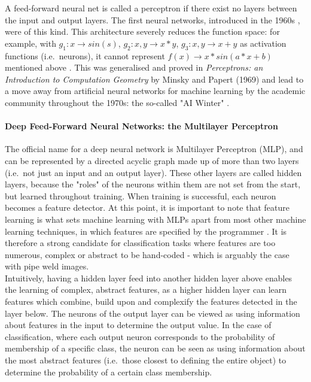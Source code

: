 \documentclass[a4paper,11pt]{article}
\begin{document}
A feed-forward neural net is called a perceptron if there exist no layers between the input and output layers. The first neural networks, introduced in the 1960s \cite{DL-book}, were of this kind. This architecture severely reduces the function space: for example, with $g_{1}: x \rightarrow sin(s)$, $g_{2}: x,y \rightarrow x*y$, $g_{3}: x,y \rightarrow x+y$ as activation functions (i.e.\ neurons), it cannot represent $f(x) \rightarrow x*sin(a*x+b)$ mentioned above \cite{DL-book}. This was generalised and proved in \textit{Perceptrons: an Introduction to Computation Geometry} by Minsky and Papert (1969) and lead to a move away from artificial neural networks for machine learning by the academic community throughout the 1970s: the so-called "AI Winter" \cite{Russel & Norvig}.

\paragraph{Deep Feed-Forward Neural Networks: the Multilayer Perceptron}

The official name for a deep neural network is Multilayer Perceptron (MLP), and can be represented by a directed acyclic graph made up of more than two layers (i.e.\ not just an input and an output layer). These other layers are called hidden layers, because the "roles" of the neurons within them are not set from the start, but learned throughout training. When training is successful, each neuron becomes a feature detector. At this point, it is important to note that feature learning is what sets machine learning with MLPs apart from most other machine learning techniques, in which features are specified by the programmer \cite{DL-book}. It is therefore a strong candidate for classification tasks where features are too numerous, complex or abstract to be hand-coded - which is arguably the case with pipe weld images.\\ 

Intuitively, having a hidden layer feed into another hidden layer above enables the learning of complex, abstract features, as a higher hidden layer can learn features which combine, build upon and complexify the features detected in the layer below. The neurons of the output layer can be viewed as using information about features in the input to determine the output value. In the case of classification, where each output neuron corresponds to the probability of membership of a specific class, the neuron can be seen as using information about the most abstract features (i.e.\ those closest to defining the entire object) to determine the probability of a certain class membership. \\
\end{document}
